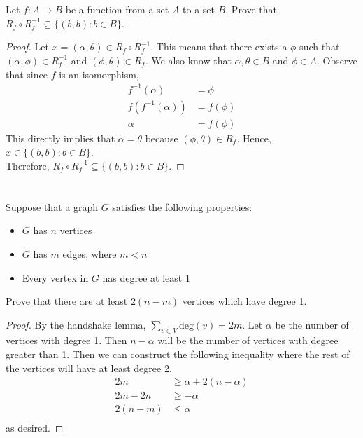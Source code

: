 \documentclass[11pt]{scrartcl}
\begin{document}
\section{}
Let $f: A \rightarrow B$ be a function from a set $A$ to a set $B$. Prove that
$R_{f} \circ R_{f}^{-1} \subseteq\{(b, b): b \in B\}$.

\begin{proof}
	Let $x = (\alpha,\theta) \in R_{f} \circ R_{f}^{-1}$. This means that there exists a $\phi$ such that
	$(\alpha,\phi) \in R_{f}^{-1}$ and $(\phi,\theta) \in R_{f}$. We also know that $\alpha,\theta \in B$ and $\phi \in A$.
	Observe that since $f$ is an isomorphism,
	\begin{align*}
		f^{-1} (\alpha)     & = \phi    \\
		f (f^{-1} (\alpha)) & = f(\phi) \\
		\alpha              & = f(\phi)
	\end{align*}
	This directly implies that $\alpha = \theta$ because $(\phi,\theta) \in R_{f}$. Hence, $x \in \{(b, b): b \in B\}$.\\
	Therefore, $R_{f} \circ R_{f}^{-1} \subseteq\{(b, b): b \in B\}$.
\end{proof}

\section{}
Suppose that a graph $G$ satisfies the following properties:
\begin{itemize}
	\item $G$ has $n$ vertices
	\item $G$ has $m$ edges, where $m<n$
	\item Every vertex in $G$ has degree at least 1
\end{itemize}
Prove that there are at least $2 (n-m)$ vertices which have degree 1.
\begin{proof}
	By the handshake lemma, $\sum_{v \in V} \text{deg}(v) = 2m$.
	Let $\alpha$ be the number of vertices with degree 1. Then $n - \alpha$ will be the
	number of vertices with degree greater than 1. Then we can construct the following inequality
	where the rest of the vertices will have at least degree 2, 
	\begin{align*}
		2m      & \geq \alpha +  2(n - \alpha) \\
		2m - 2n & \geq - \alpha             \\
		2(n-m) & \leq \alpha             \\
	\end{align*}
	as desired.

\end{proof}
\end{document}
